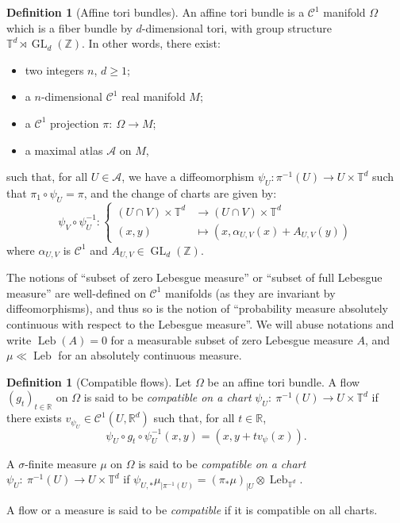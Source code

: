 \documentclass[10pt]{amsart}
\theoremstyle{definition}\newtheorem{defi}[theo]{Definition}\newtheorem{rema}[theo]{Remark}\newtheorem{exam}[theo]{Example}\newtheorem{exem}[theo]{Example}\newtheorem{nota}[theo]{Notation}
\DeclareMathOperator{\GL}{GL}
\DeclareMathOperator{\Leb}{Leb}
\newcommand{\Z}{\mathbb{Z}}
\newcommand{\R}{\mathbb{R}}
\newcommand{\Tbb}{\mathbb{T}}
\newcommand{\Acal}{\mathcal{A}}
\newcommand{\Ccal}{\mathcal{C}}
\begin{document}
\begin{defi}[Affine tori bundles]%
An affine tori bundle is a $\Ccal^1$ manifold $\Omega$ which is a fiber bundle by $d$-dimensional tori, with group structure $\Tbb^d \rtimes \GL_d (\Z)$. In other words, there exist:
\begin{itemize}
\item two integers $n$, $d \geq 1$;
\item a $n$-dimensional $\Ccal^1$ real manifold $M$;
\item a $\Ccal^1$ projection $\pi : \ \Omega \to M$;
\item a maximal atlas $\Acal$ on $M$,
\end{itemize}
such that, for all $U \in \Acal$, we have a diffeomorphism $\psi_U : \pi^{-1} (U) \to U \times \Tbb^d$ such that $\pi_1 \circ \psi_U = \pi$, and the change of charts are given by:
\[
\psi_V \circ \psi_U^{-1} : 
\begin{cases}
(U \cap V) \times \Tbb^d & \to (U \cap V) \times \Tbb^d \\
(x,y) & \mapsto (x, \alpha_{U, V} (x) + A_{U, V} (y))
\end{cases}
\]
where $\alpha_{U,V}$ is $\Ccal^1$ and $A_{U, V} \in \GL_d (\Z)$.
\end{defi}


The notions of ``subset of zero Lebesgue measure'' or ``subset of full Lebesgue measure'' are well-defined on $\Ccal^1$ manifolds (as they are invariant by diffeomorphisms), and thus so is the notion of ``probability measure absolutely continuous with respect to the Lebesgue measure''. We will abuse notations and write $\Leb (A) = 0$ for a measurable subset of zero Lebesgue measure $A$, and $\mu \ll \Leb$ for an absolutely continuous measure.


\begin{defi}[Compatible flows]%
Let $\Omega$ be an affine tori bundle. A flow $(g_t)_{t \in \R}$ on $\Omega$ is said to be \emph{compatible on a chart} $\psi_U : \ \pi^{-1} (U) \to U \times \Tbb^d$ if there exists $v_{\psi_U} \in \Ccal^1 (U, \R^d)$ such that, for all $t \in \R$,
\[
\psi_U \circ g_t \circ \psi_U^{-1} (x,y) = (x, y + t v_\psi (x)).
\]

A $\sigma$-finite measure $\mu$ on $\Omega$ is said to be \emph{compatible on a chart} $\psi_U : \ \pi^{-1} (U) \to U \times \Tbb^d$ if $\psi_{U,*} \mu_{|\pi^{-1} (U)} = (\pi_* \mu)_{|U} \otimes \Leb_{\Tbb^d}$.


A flow or a measure is said to be \emph{compatible} if it is compatible on all charts.
\end{defi}
\end{document}
